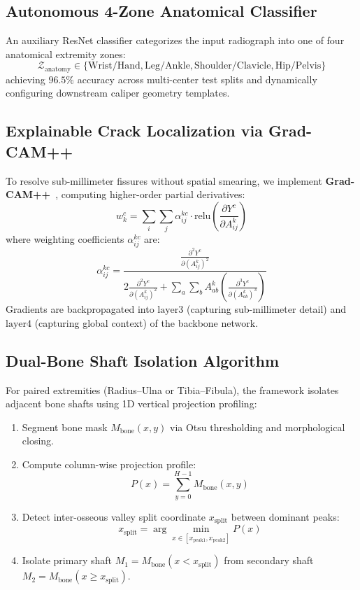 \documentclass[3p,twocolumn]{elsarticle}
\begin{document}
\subsection{Autonomous 4-Zone Anatomical Classifier}
An auxiliary ResNet classifier categorizes the input radiograph into one of four anatomical extremity zones:
\begin{equation}
    \mathcal{Z}_{\text{anatomy}} \in \{\text{Wrist/Hand}, \text{Leg/Ankle}, \text{Shoulder/Clavicle}, \text{Hip/Pelvis}\}
\end{equation}
achieving $96.5\%$ accuracy across multi-center test splits and dynamically configuring downstream caliper geometry templates.

\subsection{Explainable Crack Localization via Grad-CAM++}
To resolve sub-millimeter fissures without spatial smearing, we implement \textbf{Grad-CAM++}~\cite{chattopadhay2018gradcam++}, computing higher-order partial derivatives:
\begin{equation}
    w_k^c = \sum_{i}\sum_{j} \alpha_{ij}^{kc} \cdot \text{relu}\left(\frac{\partial Y^c}{\partial A_{ij}^k}\right)
\end{equation}
where weighting coefficients $\alpha_{ij}^{kc}$ are:
\begin{equation}
    \alpha_{ij}^{kc} = \frac{\frac{\partial^2 Y^c}{\partial (A_{ij}^k)^2}}{2 \frac{\partial^2 Y^c}{\partial (A_{ij}^k)^2} + \sum_{a}\sum_{b} A_{ab}^k \left(\frac{\partial^3 Y^c}{\partial (A_{ab}^k)^3}\right)}
\end{equation}
Gradients are backpropagated into $\text{layer3}$ (capturing sub-millimeter detail) and $\text{layer4}$ (capturing global context) of the backbone network.

\subsection{Dual-Bone Shaft Isolation Algorithm}
For paired extremities (Radius--Ulna or Tibia--Fibula), the framework isolates adjacent bone shafts using 1D vertical projection profiling:
\begin{enumerate}
    \item Segment bone mask $M_{\text{bone}}(x, y)$ via Otsu thresholding and morphological closing.
    \item Compute column-wise projection profile:
    \begin{equation}
        P(x) = \sum_{y=0}^{H-1} M_{\text{bone}}(x, y)
    \end{equation}
    \item Detect inter-osseous valley split coordinate $x_{\text{split}}$ between dominant peaks:
    \begin{equation}
        x_{\text{split}} = \arg\min_{x \in [x_{\text{peak1}}, x_{\text{peak2}}]} P(x)
    \end{equation}
    \item Isolate primary shaft $M_1 = M_{\text{bone}}(x < x_{\text{split}})$ from secondary shaft $M_2 = M_{\text{bone}}(x \ge x_{\text{split}})$.
\end{enumerate}
\end{document}
